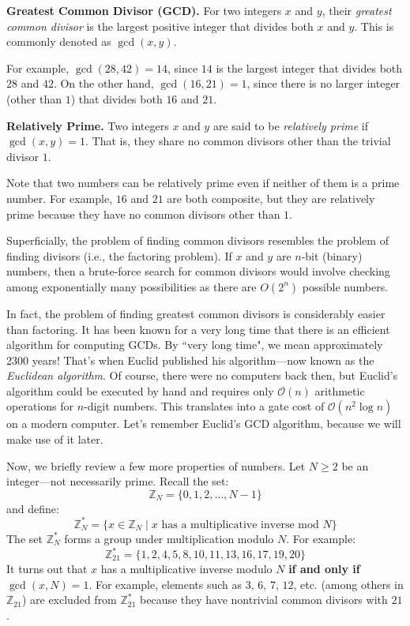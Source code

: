 \begin{definition}
    \textbf{Greatest Common Divisor (GCD).} For two integers $x$ and $y$, their \emph{greatest common divisor} is the largest positive integer that divides both $x$ and $y$. This is commonly denoted as $\gcd(x, y)$.
\end{definition}

\noindent
For example, $\gcd(28, 42) = 14$, since $14$ is the largest integer that divides both $28$ and $42$. On the other hand, $\gcd(16, 21) = 1$, since there is no larger integer (other than $1$) that divides both $16$ and $21$.

\vspace{1em}

\begin{definition}
    \textbf{Relatively Prime.} Two integers $x$ and $y$ are said to be \emph{relatively prime} if $\gcd(x, y) = 1$. That is, they share no common divisors other than the trivial divisor $1$.
\end{definition}

\noindent
Note that two numbers can be relatively prime even if neither of them is a prime number. For example, $16$ and $21$ are both composite, but they are relatively prime because they have no common divisors other than $1$.

Superficially, the problem of finding common divisors resembles the problem of finding divisors (i.e., the factoring problem). If $x$ and $y$ are $n$-bit (binary) numbers, then a brute-force search for common divisors would involve checking among exponentially many possibilities as there are $O(2^n)$ possible numbers.

In fact, the problem of finding greatest common divisors is considerably easier than factoring. It has been known for a very long time that there is an efficient algorithm for computing GCDs. By ``very long time", we mean approximately 2300 years! That's when Euclid published his algorithm—now known as the \textit{Euclidean algorithm}. Of course, there were no computers back then, but Euclid's algorithm could be executed by hand and requires only $\mathcal{O}(n)$ arithmetic operations for $n$-digit numbers. This translates into a gate cost of $\mathcal{O}(n^2 \log n)$ on a modern computer. Let's remember Euclid's GCD algorithm, because we will make use of it later.

\vspace{1em}

Now, we briefly review a few more properties of numbers. Let $N \geq 2$ be an integer—not necessarily prime. Recall the set:
\[
\mathbb{Z}_N = \{0, 1, 2, \ldots, N - 1\}
\]
and define:
\[
\mathbb{Z}_N^* = \{x \in \mathbb{Z}_N \mid x \text{ has a multiplicative inverse mod } N\}
\]
The set $\mathbb{Z}_N^*$ forms a group under multiplication modulo $N$. For example:
\[
\mathbb{Z}_{21}^* = \{1, 2, 4, 5, 8, 10, 11, 13, 16, 17, 19, 20\}
\]
It turns out that $x$ has a multiplicative inverse modulo $N$ \textbf{if and only if} $\gcd(x, N) = 1$. For example, elements such as $3$, $6$, $7$, $12$, etc. (among others in $\mathbb{Z}_{21}$) are excluded from $\mathbb{Z}_{21}^*$ because they have nontrivial common divisors with $21$.

